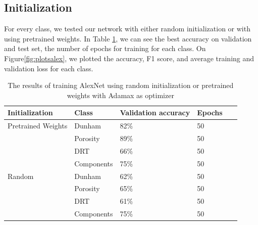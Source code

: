 \subsection{Initialization}
For every class, we tested our network with either random initialization or with using pretrained weights. In Table \ref{tab:alexinit}, we can see the best accuracy on validation and test set, the number of epochs for training for each class.  
On Figure\ref{fig:plotsalex}, we plotted the accuracy, F1 score, and average training and validation loss for each class. 
\begin{table}
\caption{\label{tab:alexinit} The results of training AlexNet using random initialization or pretrained weights with Adamax as optimizer}
\centering
\begin{tabular}[b]{| l | l | l | l | l |}
\hline
    Initialization & Class & Validation accuracy  & Epochs\ \\ \hline
    \multirow{}{}{Pretrained Weights} & Dunham &  82\%  & 50 \\ %
    & Porosity & 89\% &  50 \\
    &DRT & 66\% &  50 \\
    &Components & 75\% &  50 \\ \hline
     \multirow{}{}{Random} & Dunham &  62\% & 50 \\
    & Porosity & 65\% &  50 \\
    &DRT & 61\% &  50 \\
    &Components & 75\% & 50 \\ \hline
\end{tabular} 
\end{table}

